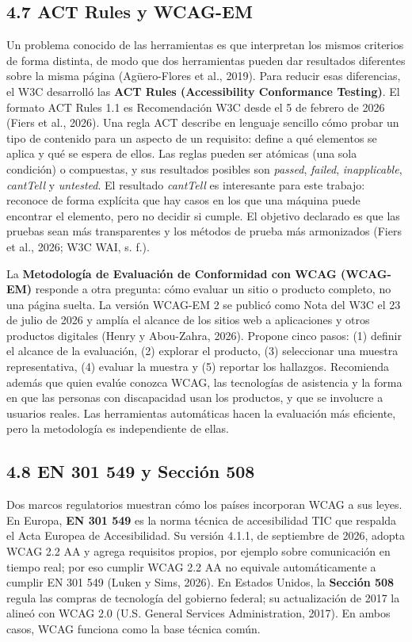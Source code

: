 \documentclass[10pt,letterpaper,onecolumn]{IEEEtran}
\begin{document}
\subsection{4.7 ACT Rules y WCAG-EM}\label{act-rules-y-wcag-em}

Un problema conocido de las herramientas es que interpretan los mismos criterios de forma distinta, de modo que dos herramientas pueden dar resultados diferentes sobre la misma página (Agüero-Flores et al., 2019). Para reducir esas diferencias, el W3C desarrolló las \textbf{ACT Rules (Accessibility Conformance Testing)}. El formato ACT Rules 1.1 es Recomendación W3C desde el 5 de febrero de 2026 (Fiers et al., 2026). Una regla ACT describe en lenguaje sencillo cómo probar un tipo de contenido para un aspecto de un requisito: define a qué elementos se aplica y qué se espera de ellos. Las reglas pueden ser atómicas (una sola condición) o compuestas, y sus resultados posibles son \emph{passed}, \emph{failed}, \emph{inapplicable}, \emph{cantTell} y \emph{untested}. El resultado \emph{cantTell} es interesante para este trabajo: reconoce de forma explícita que hay casos en los que una máquina puede encontrar el elemento, pero no decidir si cumple. El objetivo declarado es que las pruebas sean más transparentes y los métodos de prueba más armonizados (Fiers et al., 2026; W3C WAI, s. f.).

La \textbf{Metodología de Evaluación de Conformidad con WCAG (WCAG-EM)} responde a otra pregunta: cómo evaluar un sitio o producto completo, no una página suelta. La versión WCAG-EM 2 se publicó como Nota del W3C el 23 de julio de 2026 y amplía el alcance de los sitios web a aplicaciones y otros productos digitales (Henry y Abou-Zahra, 2026). Propone cinco pasos: (1) definir el alcance de la evaluación, (2) explorar el producto, (3) seleccionar una muestra representativa, (4) evaluar la muestra y (5) reportar los hallazgos. Recomienda además que quien evalúe conozca WCAG, las tecnologías de asistencia y la forma en que las personas con discapacidad usan los productos, y que se involucre a usuarios reales. Las herramientas automáticas hacen la evaluación más eficiente, pero la metodología es independiente de ellas.

\subsection{4.8 EN 301 549 y Sección 508}\label{en-301-549-y-secciuxf3n-508}

Dos marcos regulatorios muestran cómo los países incorporan WCAG a sus leyes. En Europa, \textbf{EN 301 549} es la norma técnica de accesibilidad TIC que respalda el Acta Europea de Accesibilidad. Su versión 4.1.1, de septiembre de 2026, adopta WCAG 2.2 AA y agrega requisitos propios, por ejemplo sobre comunicación en tiempo real; por eso cumplir WCAG 2.2 AA no equivale automáticamente a cumplir EN 301 549 (Luken y Sims, 2026). En Estados Unidos, la \textbf{Sección 508} regula las compras de tecnología del gobierno federal; su actualización de 2017 la alineó con WCAG 2.0 (U.S. General Services Administration, 2017). En ambos casos, WCAG funciona como la base técnica común.
\end{document}

